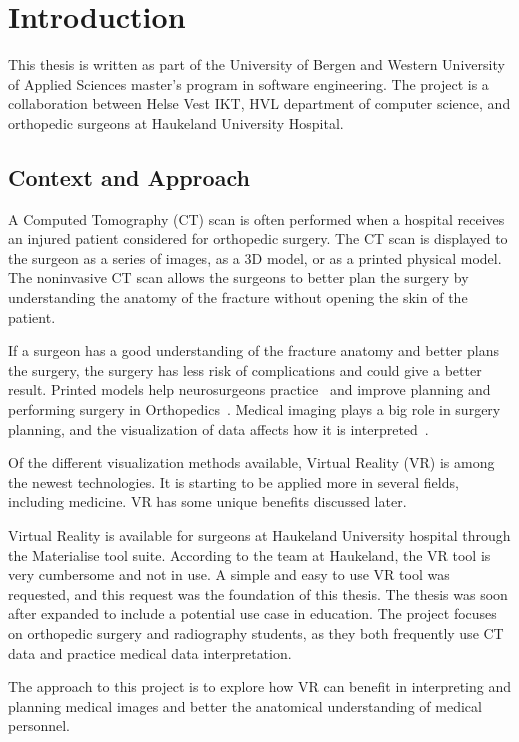 \documentclass[a4paper]{report}
\begin{document}
\chapter{Introduction}
This thesis is written as part of the University of Bergen and Western University of Applied Sciences master's program in software engineering. The project is a collaboration between Helse Vest IKT, HVL department of computer science, and orthopedic surgeons at Haukeland University Hospital.

\section{Context and Approach}
A Computed Tomography (CT) scan is often performed when a hospital receives an injured patient considered for orthopedic surgery. The CT scan is displayed to the surgeon as a series of images, as a 3D model, or as a printed physical model. The noninvasive CT scan allows the surgeons to better plan the surgery by understanding the anatomy of the fracture without opening the skin of the patient.

If a surgeon has a good understanding of the fracture anatomy and better plans the surgery,
the surgery has less risk of complications and could give a better result.
Printed models help neurosurgeons practice~\cite{shahrubudin_overview_2019} and improve planning and performing surgery in Orthopedics~\cite{chen_efficacy_2019}.
Medical imaging plays a big role in surgery planning, and the visualization of data affects how it is interpreted~\cite{bradley_history_2008}.

Of the different visualization methods available, Virtual Reality (VR) is among the newest technologies. It is starting to be applied more in several fields, including medicine. VR has some unique benefits discussed later.

Virtual Reality is available for surgeons at Haukeland University hospital through the Materialise tool suite. According to the team at Haukeland, the VR tool is very cumbersome and not in use. A simple and easy to use VR tool was requested, and this request was the foundation of this thesis. The thesis was soon after expanded to include a potential use case in education. The project focuses on orthopedic surgery and radiography students, as they both frequently use CT data and practice medical data interpretation.

The approach to this project is to explore how VR can benefit in interpreting and planning medical images and better the anatomical understanding of medical personnel.
\end{document}
